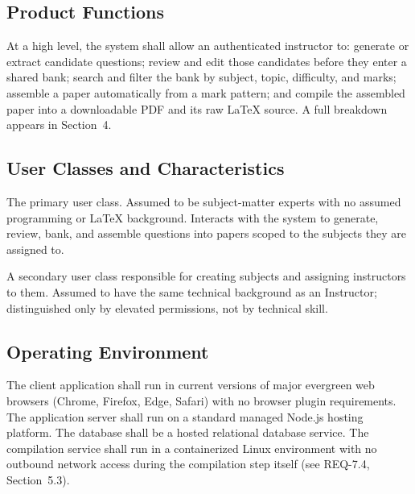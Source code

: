 \documentclass[11pt]{article}
\begin{document}
\subsection{Product Functions}
At a high level, the system shall allow an authenticated instructor to:
generate or extract candidate questions; review and edit those candidates
before they enter a shared bank; search and filter the bank by subject,
topic, difficulty, and marks; assemble a paper automatically from a mark
pattern; and compile the assembled paper into a downloadable PDF and its
raw LaTeX source. A full breakdown appears in Section~4.

\subsection{User Classes and Characteristics}
\begin{description}[leftmargin=!,labelwidth=3.2cm]
  \item[Instructor] The primary user class. Assumed to be subject-matter
    experts with no assumed programming or LaTeX background. Interacts with
    the system to generate, review, bank, and assemble questions into
    papers scoped to the subjects they are assigned to.
  \item[Administrator] A secondary user class responsible for creating
    subjects and assigning instructors to them. Assumed to have the same
    technical background as an Instructor; distinguished only by elevated
    permissions, not by technical skill.
\end{description}

\subsection{Operating Environment}
The client application shall run in current versions of major evergreen
web browsers (Chrome, Firefox, Edge, Safari) with no browser plugin
requirements. The application server shall run on a standard managed Node.js
hosting platform. The database shall be a hosted relational database
service. The compilation service shall run in a containerized Linux
environment with no outbound network access during the compilation step
itself (see REQ-7.4, Section~5.3).
\end{document}
